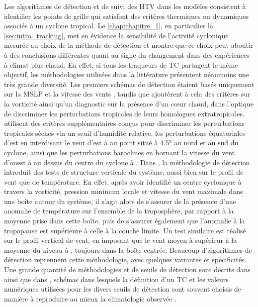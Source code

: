 \documentclass[../main.tex]{subfiles}
\begin{document}
Les algorithmes de détection et de suivi des HTV dans les modèles consistent à identifier les points de grille qui satisfont des critères thermiques ou
dynamiques associés à un cyclone tropical. Le \cref{chap:chapitre_1}, en particulier la \cref{sec:intro_tracking}, met en évidence la sensibilité de l'activité
cyclonique mesurée au choix de la méthode de détection et montre que ce choix peut aboutir à des conclusions différentes quant au signe du changement dans des
expériences à climat plus chaud. En effet, si tous les traqueurs de TC partagent le même objectif, les méthodologies utilisées dans la littérature présentent
néanmoins une très grande diversité. Les premiers schémas de détection étaient basés uniquement sur la MSLP et la vitesse des vents
\parencite{bengtsson_simulation_1982,broccoli_can_1990}, tandis que \textcite{haarsma_tropical_1993,bengtsson_hurricanetype_1995} ajoutèrent à cela des critères
sur la vorticité ainsi qu'un diagnostic sur la présence d'un cœur chaud, dans l'optique de discriminer les perturbations tropicales de leurs homologues
extratropicales. \textcite{wu_gcm_1992} utilisent des critères supplémentaires conçus pour discriminer les perturbations tropicales sèches via un seuil
d'humidité relative, les perturbations équatoriales d'est en interdisant le vent d'est à  au point situé à \ang{4.5} au nord et au sud du cyclone,
ainsi que les perturbations baroclines en bornant la vitesse du vent d'ouest à  au dessus du centre du cyclone à . Dans
\textcite{bengtsson_hurricanetype_1995}, la méthodologie de détection introduit des tests de structure verticale du système, aussi bien sur le profil de vent
que de température. En effet, après avoir identifié un centre cyclonique à travers la vorticité, pression minimum locale et vitesse du vent maximale dans une
boîte autour du système, il s'agit alors de s'assurer de la présence d'une anomalie de température sur l'ensemble de la troposphère, par rapport à la moyenne
prise dans cette boîte, puis de s'assurer également que l'anomalie à la tropopause est supérieure à celle à la couche limite. Un test similaire est réalisé sur
le profil vertical de vent, en imposant que le vent moyen à  supérieur à la moyenne du niveau à , toujours dans la boîte centrée. Beaucoup
d'algorithmes de détection reprennent cette méthodologie, avec quelques variantes et spécificités. Une grande quantité de méthodologies et de seuils de
détection sont décrits dans \textcite{walsh_objectively_2007} ainsi que dans \cite[][Annexe B]{ullrich_tempestextremes_2017}, schémas dans lesquels la
définition d'un TC et les valeurs numériques utilisées pour les divers seuils de détection sont souvent choisis de manière à reproduire au mieux la climatologie
observée \parencite{walsh_objectively_2007,tory_development_2013}.
\end{document}
